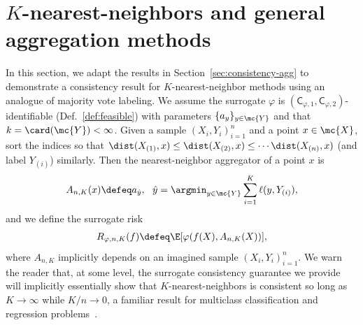 \documentclass[11pt]{article}
\newcommand{\constant}{\mathsf{C}}  %
\newcommand{\tloss}{\ell}  %
\newcommand{\sloss}{\varphi}  %
\newcommand{\difftrisk}{D_\tloss}  %
\newcommand{\localmeasure}{\mu}  %
\begin{document}
\section{$K$-nearest-neighbors and general aggregation methods}
\label{sec:discussion-knn}

In this section, we adapt the results in Section~\ref{sec:consistency-agg}
to demonstrate a consistency result for $K$-nearest-neighbor methods using
an analogue of majority vote labeling.
%
We assume the surrogate $\sloss$ is $(\constant_{\sloss,1},
\constant_{\sloss,2})$-identifiable (Def.~\ref{def:feasible}) with
parameters $\{a_y\}_{y \in \mc{Y}}$ and that $k = \card(\mc{Y}) < \infty$.
%
Given a sample $(X_i, Y_i)_{i = 1}^n$ and a point $x \in \mc{X}$,
sort the indices so that $\dist(X_{(1)}, x) \le \dist(X_{(2)}, x)
\le \cdots \dist(X_{(n)}, x)$ (and label $Y_{(i)}$) similarly.
%
Then the nearest-neighbor aggregator of a point $x$ is
\begin{equation}
  \label{eqn:knn-aggregator}
  A_{n,K}(x) \defeq a_{\hat{y}},
  ~~
  \hat{y} = \argmin_{y \in \mc{Y}}
  \sum_{i = 1}^K \tloss(y, Y_{(i)}),
\end{equation}
and we define the surrogate risk
\begin{align*}
  R_{\sloss,n,K}(f)
  \defeq \E[\sloss(f(X), A_{n,K}(X))],
\end{align*}
where $A_{n,K}$ implicitly depends on an imagined sample $(X_i,
Y_i)_{i=1}^n$.
%
We warn the reader that, at some level, the surrogate consistency guarantee
we provide will implicitly essentially show that $K$-nearest-neighbors is
consistent so long as $K \to \infty$ while $K/n \to 0$, a familiar result
for multiclass classification and regression problems~\citep{Stone77,
  DevroyeGyLu96}.

\end{document}
